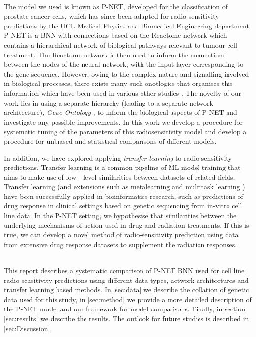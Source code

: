 \documentclass[NOTE, disdraft=true, UKenglish]{\DISCDTLATEXPATH UCLCDTDISdoc}
\begin{document}
\\ \indent 
The model we used is known as P-NET\cite{elmarakeby_biologically_2021}, developed for the classification of prostate cancer cells, which has since been adapted for radio-sensitivity predictions by the UCL Medical Physics and Biomedical Engineering department\cite{cosmin_thesis}. P-NET is a BNN with connections based on the Reactome network \cite{reactome} which contains a hierarchical network of biological pathways relevant to tumour cell treatment. The Reactome network is then used to inform the connections between the nodes of the neural network, with the input layer corresponding to the gene sequence. However, owing to the complex nature and signalling involved in biological processes, there exists many such onotlogies that organises this information which have been used in various other studies \cite{drug_cell}. The novelty of our work lies in using a separate hierarchy (leading to a separate network architecture), \textit{Gene Ontology} \cite{go_1, go_2}, to inform the biological aspects of P-NET and investigate any possible improvements. In this work we develop a procedure for systematic tuning of the parameters of this radiosensitivity model and develop a procedure for unbiased and statistical comparisons of different models.

In addition, we have explored applying \textit{transfer learning} \cite{McEwan} to radio-sensitivity predictions. Transfer learning is a common pipeline of ML model training that aims to make use of low - level similarities between datasets of related fields. Transfer learning (and extensions such as metalearning \cite{MAML} and multitask learning \cite{multitask}) have been successfully applied in bioinformatics research, such as predictions of drug response in clinical settings based on genetic sequencing from in-vitro cell line data. In the P-NET setting, we hypothesise that similarities between the underlying mechanisms of action used in drug and radiation treatments. If this is true, we can develop a novel method of radio-sensitivity prediction using data from extensive drug response datasets to supplement the radiation responses.

\\ \indent 
This report describes a systematic comparison of P-NET BNN used for cell line radio-sensitivity predictions using different data types, network architectures and transfer learning based methods. 
In \ref{sec:data} we describe the collation of genetic data used for this study, in \ref{sec:method} we provide a more detailed description of the P-NET model and our framework for model comparisons. Finally, in section \ref{sec:results} we describe the results. The outlook for future studies is described in \ref{sec:Discussion}.
 
\end{document}
